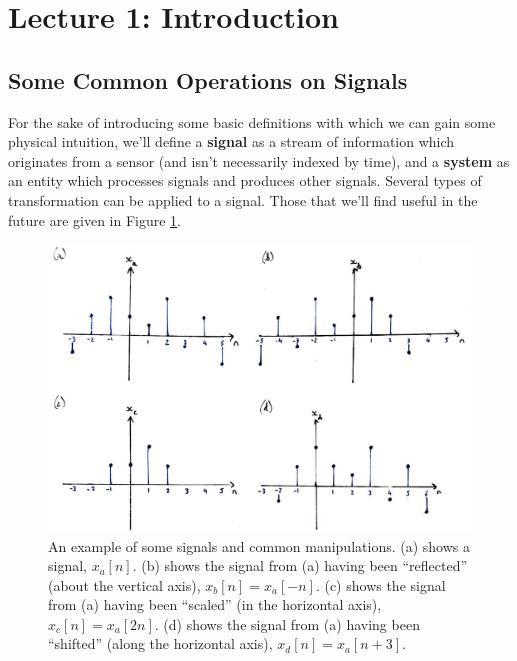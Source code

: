 \section{Lecture 1: Introduction}

\subsection{Some Common Operations on Signals}
%
For the sake of introducing some basic definitions with which we can gain some
physical intuition, we'll define a \textbf{signal} as a stream of information
which originates from a sensor (and isn't necessarily indexed by time), and a
\textbf{system} as an entity which processes signals and produces other signals.
%
Several types of transformation can be applied to a signal. Those that we'll find
useful in the future are given in Figure \ref{fig::lecture_1_signal_operations}.
%
\begin{figure}[!htb]
  \includegraphics[width=\textwidth]{images/lecture_1_signal_operations.JPG}
  \caption{
    An example of some signals and common manipulations. (a) shows a
    signal, $x_a[n]$. (b) shows the signal from (a) having been ``reflected''
    (about the vertical axis), $x_b[n] = x_a[-n]$. (c) shows the signal from (a)
    having been ``scaled'' (in the horizontal axis), $x_c[n] = x_a[2n]$. (d) shows
    the signal from (a) having been ``shifted'' (along the horizontal axis),
    $x_d[n] = x_a[n+3]$.
  }
  \label{fig::lecture_1_signal_operations}
\end{figure}


